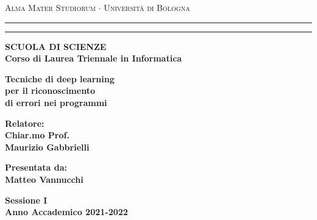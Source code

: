 \begin{titlepage}
\begin{center}
{{\Large{\textsc{Alma Mater Studiorum $\cdot$ Universit\`a di
Bologna}}}} \rule[0.1cm]{15.8cm}{0.1mm}
\rule[0.5cm]{15.8cm}{0.6mm}
{\small{\bf SCUOLA DI SCIENZE\\
Corso di Laurea Triennale in Informatica }}
\end{center}
\vspace{15mm}
\begin{center}
{\LARGE{\bf Tecniche di deep learning}}\\
\vspace{3mm}
{\LARGE{\bf per il riconoscimento}}\\
\vspace{3mm}
{\LARGE{\bf di errori nei programmi}}\\
\end{center}
\vspace{40mm}
\par
\noindent
\begin{minipage}[t]{0.47\textwidth}
{\large{\bf Relatore:\\
Chiar.mo Prof.\\
Maurizio Gabbrielli}}
\end{minipage}
\hfill
\begin{minipage}[t]{0.47\textwidth}\raggedleft
{\large{\bf Presentata da:\\
Matteo Vannucchi}}
\end{minipage}
\vspace{20mm}
\begin{center}
{\large{\bf Sessione I\\%
Anno Accademico 2021-2022}}%
\end{center}
\end{titlepage}
